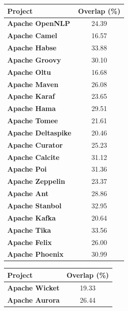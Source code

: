	\begin{table}[!htbp]
	\small
	\centering
	
	\begin{tabular}{l|c}
		\hline
		\textbf{Project}           & \textbf{Overlap (\%)} \\ \hline
		\textbf{Apache OpenNLP}    &    24.39     \\ \hline
		\textbf{Apache Camel}      &    16.57     \\ \hline
		\textbf{Apache Habse}      &    33.88     \\ \hline
		\textbf{Apache Groovy}     &    30.10     \\ \hline
		\textbf{Apache Oltu}       &    16.68     \\ \hline
		\textbf{Apache Maven}      &    26.08     \\ \hline
		\textbf{Apache Karaf}      &    23.65     \\ \hline
		\textbf{Apache Hama}       &    29.51     \\ \hline
		\textbf{Apache Tomee}      &    21.61     \\ \hline
		\textbf{Apache Deltaspike} &    20.46     \\ \hline
		\textbf{Apache Curator}    &    25.23     \\ \hline
		\textbf{Apache Calcite}    &    31.12     \\ \hline
		\textbf{Apache Poi}        &    31.36     \\ \hline
		\textbf{Apache Zeppelin}   &    23.37     \\ \hline
		\textbf{Apache Ant}        &    28.86     \\ \hline
		\textbf{Apache Stanbol}    &    32.95     \\ \hline
		\textbf{Apache Kafka}      &    20.64     \\ \hline
		\textbf{Apache Tika}       &    33.56     \\ \hline
		\textbf{Apache Felix}      &    26.00     \\ \hline
		\textbf{Apache Phoenix}    &    30.99     \\ \hline
	\end{tabular}
	\quad \quad \quad
	\begin{tabular}{l|c}
		\hline
		\textbf{Project}           & \textbf{Overlap (\%)} \\ \hline
		\textbf{Apache Wicket}     &    19.33     \\ \hline
		\textbf{Apache Aurora}     &    26.44     \\ \hline

\end{tabular}
\end{table}
